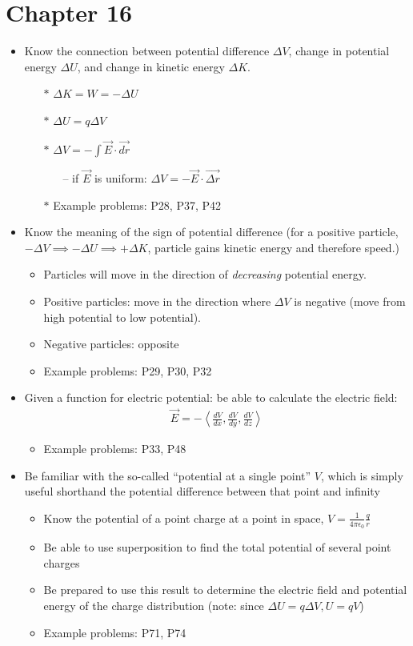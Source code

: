 \documentclass{article}
\begin{document}
\section*{Chapter 16}
\begin{itemize}
	\item Know the connection between potential difference $\Delta V$, change in potential energy $\Delta U$, and change in kinetic energy $\Delta K$.
	\begin{itemize}
		\item[$\ast$] $\Delta K = W = -\Delta U$
		\item[$\ast$] $\Delta U = q\Delta V$
		\item[$\ast$] $\Delta V = -\int\vec{E}\cdot \vec{dr}$
		\begin{itemize}
			\item[--] if $\vec{E}$ is uniform: $\Delta V = -\vec{E}\cdot\vec{\Delta r}$
		\end{itemize}
		\item[$\ast$] Example problems: P28, P37, P42
	\end{itemize}
	\item Know the meaning of the sign of potential difference (for a positive particle,  $-\Delta V\implies -\Delta U \implies + \Delta K$, particle gains kinetic energy and therefore speed.)
	\begin{itemize}
		\item Particles will move in the direction of \textit{decreasing} potential energy.
		\item Positive particles: move in the direction where $\Delta V$ is negative (move from high potential to low potential).
		\item Negative particles: opposite
		\item Example problems: P29, P30, P32
	\end{itemize}
	\item Given a function for electric potential: be able to calculate the electric field:
	\begin{eqnarray*}
	\vec{E}=-\left<\frac{dV}{dx},\frac{dV}{dy},\frac{dV}{dz}  \right>
	\end{eqnarray*}
\begin{itemize}
	\item Example problems: P33, P48
\end{itemize}
	\item Be familiar with the so-called ``potential at a single point'' $V$, which is simply useful shorthand the potential difference between that point and infinity
	\begin{itemize}
		\item Know the potential of a point charge at a point in space, $V=\frac{1}{4\pi\epsilon_0}\frac{q}{r}$
		\item Be able to use superposition to find the total potential of several point charges
		\item Be prepared to use this result to determine the electric field and potential energy of the charge distribution (note: since $\Delta U = q\Delta V, U=qV$)
		\item Example problems: P71, P74
	\end{itemize}
\end{itemize}
\end{document}
